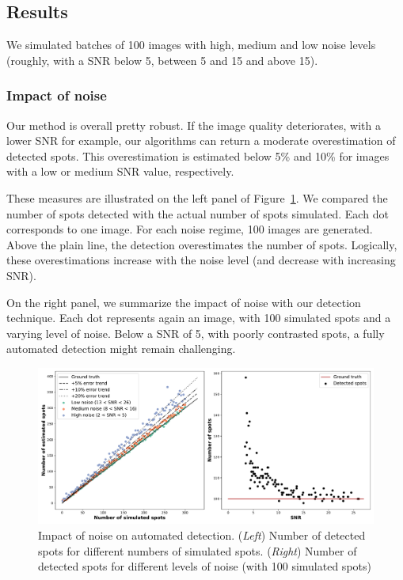 \subsection{Results}
\label{subsec:detection_results}

We simulated batches of 100 images with high, medium and low noise levels (roughly, with a \ac{SNR} below 5, between 5 and 15 and above 15).

\subsubsection{Impact of noise}

Our method is overall pretty robust.
If the image quality deteriorates, with a lower \ac{SNR} for example, our algorithms can return a moderate overestimation of detected spots.
This overestimation is estimated below 5\% and 10\% for images with a low or medium \ac{SNR} value, respectively.

These measures are illustrated on the left panel of Figure~\ref{fig:detection_error}.
We compared the number of spots detected with the actual number of spots simulated.
Each dot corresponds to one image.
For each noise regime, 100 images are generated.
Above the plain line, the detection overestimates the number of spots.
Logically, these overestimations increase with the noise level (and decrease with increasing \ac{SNR}).

On the right panel, we summarize the impact of noise with our detection technique.
Each dot represents again an image, with 100 simulated spots and a varying level of noise.
Below a \ac{SNR} of 5, with poorly contrasted spots, a fully automated detection might remain challenging.

\begin{figure}[]
    \centering
    \includegraphics[width=1\textwidth]{figures/chapter2/fused_spot_detection_noise}
    \caption[Impact of noise on automated detection]{Impact of noise on automated detection.
	(\textit{Left}) Number of detected spots for different numbers of simulated spots.
	(\textit{Right}) Number of detected spots for different levels of noise (with 100 simulated spots)}
    \label{fig:detection_error}
\end{figure}

